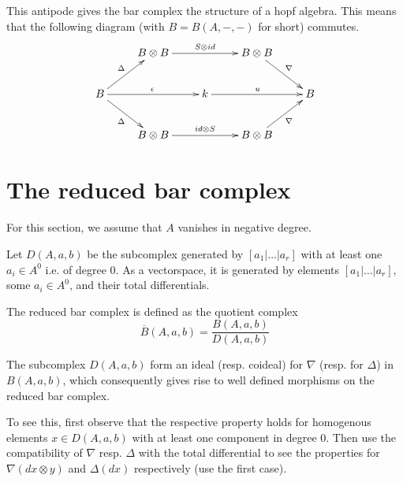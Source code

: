 This antipode gives the bar complex the structure of a hopf algebra.
This means that the following diagram (with $B = B(A,-,-)$ for short) commutes.
\begin{align*}\begin{aligned}%
\begin{xy} \xymatrix{ 
 & B \otimes B \ar[rr]^{S \otimes id} & & B \otimes B \ar[dr]^\nabla \\
B \ar[ur]^\Delta \ar[dr]_\Delta \ar[rr]^\epsilon & & k \ar[rr]^u & & B \\
& B \otimes B \ar[rr]^{id \otimes S}  & & B \otimes B \ar[ur]_\nabla  
} \end{xy} \end{aligned} \end{align*}



\section{The reduced bar complex}

For this section, we assume that $A$ vanishes in negative degree.

Let $D(A, a, b)$ be the subcomplex generated by $[a_1 | \ldots | a_r]$ with at least one $a_i \in A^0$ i.e. of degree $0$. As a vectorspace, it is generated by elements $[a_1 | \ldots | a_r]$, some $a_i \in A^0$, and their total differentials.

\begin{defn}
The reduced bar complex is defined as the quotient complex
\[
\overline{B}(A, a, b) = \frac{B(A, a, b)}{D(A, a, b)}
\]
\end{defn}

The subcomplex $D(A, a, b)$ form an ideal (resp. coideal) for $\nabla$ (resp. for $\Delta$) in $B(A, a, b)$, which consequently gives rise to well defined morphisms on the reduced bar complex. 

To see this, first observe that the respective property holds for homogenous elements $x \in D(A,a,b)$ with at least one component in degree $0$.
Then use the compatibility of $\nabla$ resp. $\Delta$ with the total differential to see the properties for $\nabla(dx \otimes y)$ and $\Delta(dx)$ respectively (use the first case).



